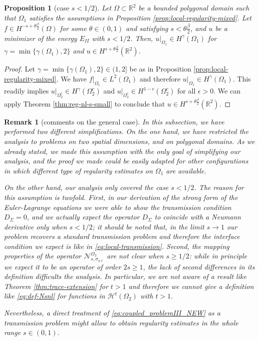 \documentclass{amsart}
\newcommand{\Ol}{\Omega_{1}}%
\newcommand{\Onl}{\Omega_{2}}%
\newcommand{\snl}{{\sigma_{n\ell}}}
\def\R{{\mathbb R}}
\newcommand{\Nsnl}{\mathcal{N}_{s,\snl}}
\theoremstyle{plain}
\newtheorem{proposition}{Proposition}
\newtheorem{remark}{Remark}
\numberwithin{equation}{section}
\numberwithin{table}{section}
\numberwithin{figure}{section}
\numberwithin{theorem}{section}
\numberwithin{corollary}{section}
\numberwithin{definition}{section}
\numberwithin{lemma}{section}
\numberwithin{proposition}{section}
\numberwithin{remark}{section}
\begin{document}
\begin{proposition}[case $s<1/2$] \label{prop:regularity-small-s}
Let $\Omega \subset \R^2$ be a bounded polygonal domain such that $\Ol$ satisfies the assumptions in Proposition \ref{prop:local-regularity-mixed}. Let $f \in H^{-s+\theta\frac\beta2}(\Omega)$ for some $\theta \in (0,1)$ and satisfying $s < \theta\frac\beta2$, and $u$ be a minimizer of the energy $E_{II}$ with $s<1/2$. Then, $u|_{\Ol} \in H^{\gamma}(\Ol)$ for $\gamma = \min\{\gamma(\Ol),2\}$ and $u \in H^{s+\theta\frac\beta2}(\R^2)$.
\end{proposition}
\begin{proof}
Let $\gamma = \min\{\gamma(\Ol),2\} \in (1,2]$ be as in Proposition \ref{prop:local-regularity-mixed}. We have $f|_{\Ol}  \in L^2(\Ol)$ and therefore $u|_{\Ol} \in H^{\gamma}(\Ol)$. This readily implies $u|_{\Onl^c} \in H^{\gamma}(\Onl^c)$ and $u|_{\Onl^c} \in H^{1-\epsilon}(\Onl^c)$ for all $\epsilon > 0$. We can apply Theorem \ref{thm:reg-nl-s-small} to conclude that $u \in H^{s+\theta\frac\beta2}(\R^2)$.
\end{proof}

\begin{remark}[comments on the general case]
In this subsection, we have performed two different simplifications. On the one hand, we have restricted the analysis to problems on two spatial dimensions, and on polygonal domains. As we already stated, we made this assumption with the only goal of simplifying our analysis, and the proof we made could be easily adapted for other configurations in which different type of regularity estimates on $\Ol$ are available.

On the other hand, our analysis only covered the case $s<1/2$. The reason for this assumption is twofold. First, in our derivation of the strong form of the Euler-Lagrange equations we were able to show the transmission condition $D_\Sigma = 0$, and we actually expect the operator $D_\Sigma$ to coincide with a Neumann derivative only when $s<1/2$; it should be noted that, in the limit $s \to 1$ our problem recovers a standard transmission problem and therefore the interface condition we expect is like in \eqref{eq:local-transmission}. Second, the mapping properties of the operator $\Nsnl^{\Onl}$ are not clear when $s \ge 1/2$: while in principle we expect it to be an operator of order $2s \ge 1$, the lack of second differences in its definition difficults the analysis. In particular, we are not aware of a result like Theorem \ref{thm:trace-extension} for $t > 1$ and therefore we cannot give a definition like \eqref{eq:def-Nsnl} for functions in $\mathcal{H}^t(\Onl)$ with $t > 1$.


Nevertheless, a direct treatment of \eqref{eq:coupled_problemIII_NEW} as a transmission problem might allow to obtain regularity estimates in the whole range $s \in (0,1)$.
\end{remark}
\end{document}
